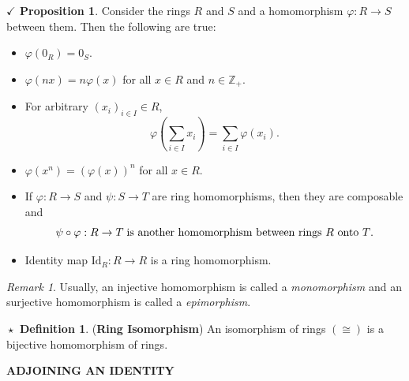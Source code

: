 \documentclass{article}
\theoremstyle{definition}
\newtheorem{definition}{$\boxed{\star}$ Definition}
\theoremstyle{remark}
\newtheorem*{remark}{Remark}
\theoremstyle{definition}
\theoremstyle{definition}
\newtheorem{proposition}{$\checkmark$ Proposition}
\theoremstyle{definition}
\theoremstyle{proof}
\newcommand{\isomorph}{\cong}
\newcommand{\Id}[1]{\text{Id}_{#1}}
\begin{document}
\hrulefill
\begin{proposition}
	Consider the rings $ R $ and $ S $ and a homomorphism $ \varphi: R\to S $ between them. Then the following are true:
	\begin{itemize}
		\item{$ \varphi(0_R) = 0_S$.}
		\item{$ \varphi(nx) = n\varphi(x) $ for all $ x\in R $ and $ n\in \mathbb{Z}_+ $.}
		\item{For arbitrary $ (x_i)_{i\in I} \in R$,  $$ \varphi\left (\sum_{i\in I}x_i\right )  = \sum_{i\in I}\varphi(x_i).$$}
		\item{$ \varphi(x^n) = (\varphi(x))^n $ for all $ x\in R $.}
		\item{If $ \varphi: R\to S $ and $ \psi : S \to T $ are ring homomorphisms, then they are composable and 
		\[\psi \circ \varphi : R\to T\;\text{is another homomorphism between rings $ R $ onto $ T $.}\]	
		}
	\item{Identity map $ \Id{R} :R\to R$ is a ring homomorphism.}
	\end{itemize}
\end{proposition}
\begin{remark}
	Usually, an injective homomorphism is called a \emph{monomorphism} and an surjective homomorphism is called a \emph{epimorphism}.
\end{remark}
\hrulefill
\begin{definition}
	(\textbf{Ring Isomorphism}) An isomorphism of rings $ (\isomorph) $ is a bijective homomorphism of rings.
\end{definition}
\hrulefill
\newpage
\hrulefill
\textbf{ADJOINING AN IDENTITY}
\hrulefill
\end{document}
